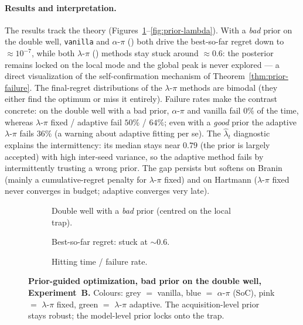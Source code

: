 \paragraph{Results and interpretation.}
The results track the theory (Figures~\ref{fig:prior-bench}--\ref{fig:prior-lambda}).
With a \emph{bad} prior on the double well, \texttt{vanilla} and $\alpha$-$\pi$
(\RIGHT) both drive the best-so-far regret down to $\approx10^{-7}$, while both
$\lambda$-$\pi$ (\WRONG) methods stay stuck around $\approx0.6$: the posterior
remains locked on the local mode and the global peak is never explored --- a
direct visualization of the self-confirmation mechanism of
Theorem~\ref{thm:prior-failure}. The final-regret distributions of the
$\lambda$-$\pi$ methods are bimodal (they either find the optimum or miss it
entirely). Failure rates make the contrast concrete: on the double well with a
bad prior, $\alpha$-$\pi$ and vanilla fail $0\%$ of the time, whereas
$\lambda$-$\pi$ fixed / adaptive fail $50\%$ / $64\%$; even with a \emph{good}
prior the adaptive $\lambda$-$\pi$ fails $36\%$ (a warning about adaptive fitting
per se). The $\widehat\lambda_t$ diagnostic explains the intermittency: its median
stays near $0.79$ (the prior is largely accepted) with high inter-seed variance,
so the adaptive method fails by intermittently trusting a wrong prior. The gap
persists but softens on Branin (mainly a cumulative-regret penalty for
$\lambda$-$\pi$ fixed) and on Hartmann ($\lambda$-$\pi$ fixed never converges in
budget; adaptive converges very late).

\begin{figure}[htbp]
  \centering
  \begin{subfigure}[b]{0.32\linewidth}
    \centering{}
    \caption{Double well with a \emph{bad} prior (centred on the local trap).}
  \end{subfigure}\hfill
  \begin{subfigure}[b]{0.32\linewidth}
    \centering{}
    \caption{Best-so-far regret: \WRONG{} stuck at $\sim0.6$.}
  \end{subfigure}\hfill
  \begin{subfigure}[b]{0.32\linewidth}
    \centering{}
    \caption{Hitting time / failure rate.}
  \end{subfigure}
  \caption{\textbf{Prior-guided optimization, bad prior on the double well,
  Experiment~B.} Colours: grey $=$ vanilla, blue $=$ $\alpha$-$\pi$ (SoC),
  pink $=$ $\lambda$-$\pi$ fixed, green $=$ $\lambda$-$\pi$ adaptive. The
  acquisition-level prior stays robust; the model-level prior locks onto the
  trap.}
  \label{fig:prior-bench}
\end{figure}

